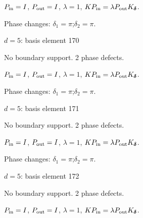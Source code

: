 \vspace{-1mm}
$P_{\rm in}=I$, \quad $P_{\rm out}=I$, \quad $\lambda=1$, \qquad $K P_{\rm in}=\lambda P_{\rm out}K_{\boldsymbol\delta}$.
\par\smallskip\begin{minipage}{.98\linewidth}\small Phase changes: $\delta_{1}=\pi$;\quad $\delta_{2}=\pi$.\end{minipage}
\vfill
{\footnotesize\texttt{}}
\newpage
{}
{\Large $d=5$: basis element 170}\par
No boundary support. 2 phase defects.
\begin{center}
\end{center}
\vspace{-1mm}
$P_{\rm in}=I$, \quad $P_{\rm out}=I$, \quad $\lambda=1$, \qquad $K P_{\rm in}=\lambda P_{\rm out}K_{\boldsymbol\delta}$.
\par\smallskip\begin{minipage}{.98\linewidth}\small Phase changes: $\delta_{1}=\pi$;\quad $\delta_{2}=\pi$.\end{minipage}
\vfill
{\footnotesize\texttt{}}
\newpage
{}
{\Large $d=5$: basis element 171}\par
No boundary support. 2 phase defects.
\begin{center}
\end{center}
\vspace{-1mm}
$P_{\rm in}=I$, \quad $P_{\rm out}=I$, \quad $\lambda=1$, \qquad $K P_{\rm in}=\lambda P_{\rm out}K_{\boldsymbol\delta}$.
\par\smallskip\begin{minipage}{.98\linewidth}\small Phase changes: $\delta_{1}=\pi$;\quad $\delta_{2}=\pi$.\end{minipage}
\vfill
{\footnotesize\texttt{}}
\newpage
{}
{\Large $d=5$: basis element 172}\par
No boundary support. 2 phase defects.
\begin{center}
\end{center}
\vspace{-1mm}
$P_{\rm in}=I$, \quad $P_{\rm out}=I$, \quad $\lambda=1$, \qquad $K P_{\rm in}=\lambda P_{\rm out}K_{\boldsymbol\delta}$.
